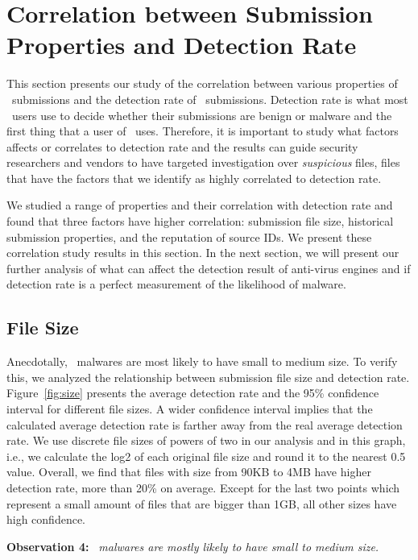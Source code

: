 \section{Correlation between Submission Properties and Detection Rate}
\label{sec:corr}
This section presents our study of the correlation between various properties of \pe\ submissions and the detection rate of \pe\ submissions.
Detection rate is what most \vt\ users use to decide whether their submissions are benign or malware 
and the first thing that a user of \vt\ uses.
Therefore, it is important to study what factors affects or correlates to detection rate
and the results can guide security researchers and vendors to have targeted investigation over {\em suspicious} files, 
files that have the factors that we identify as highly correlated to detection rate.

We studied a range of properties and their correlation with detection rate
and found that three factors have higher correlation:
submission file size,
historical submission properties, and the reputation of source IDs.
We present these correlation study results in this section.
In the next section, we will present our further analysis of what can affect the detection result of anti-virus engines
and if detection rate is a perfect measurement of the likelihood of malware.



\subsection{File Size}
\label{sec:size}
Anecdotally, \pe\ malwares are most likely to have small to medium size. 
To verify this, we analyzed the relationship between submission file size and detection rate. 
Figure~\ref{fig:size} presents the average detection rate and 
the 95\% confidence interval for different file sizes.
A wider confidence interval implies that
the calculated average detection rate is farther away from the real average detection rate.
We use discrete file sizes of powers of two in our analysis and in this graph,
i.e., we calculate the log2 of each original file size and round it to the nearest 0.5 value.
Overall, we find that files with size from 90KB to 4MB have higher detection rate, more than 20\% on average. 
Except for the last two points which represent a small amount of files that are bigger than 1GB, 
all other sizes have high confidence.   

{\bf Observation 4:} 
{\em \pe\ malwares are mostly likely to have small to medium size.}

